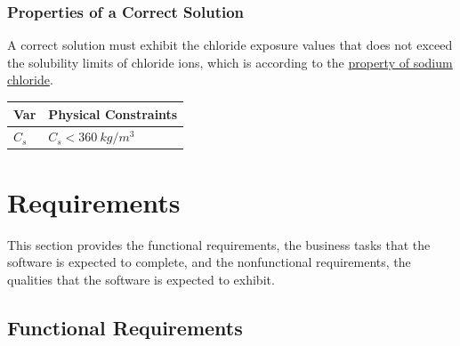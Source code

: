 \documentclass[12pt]{article}
\begin{document}
\noindent 
\subsubsection{Properties of a Correct Solution} \label{sec_CorrectSolution}

\noindent
A correct solution must exhibit the chloride exposure values that does not exceed the solubility limits of chloride ions, which is according to the \href{https://en.m.wikipedia.org/wiki/Sodium_chloride}{property of sodium chloride}.
\begin{table}[!h]
\caption{Output Variables} \label{TblOutputVar}
\renewcommand{\arraystretch}{1.2}
\noindent \begin{longtable*}{l l} 
  \toprule
  \textbf{Var} & \textbf{Physical Constraints} \\
  \midrule 
  $C_s$ & $C_s < 360 ~ kg/m^3$  \\
  
   \bottomrule
\end{longtable*}
\end{table}

\newpage
\section{Requirements}
This section provides the functional requirements, the business tasks that the
software is expected to complete, and the nonfunctional requirements, the
qualities that the software is expected to exhibit.

\indent 
\newpage
\subsection{Functional Requirements}
\end{document}
